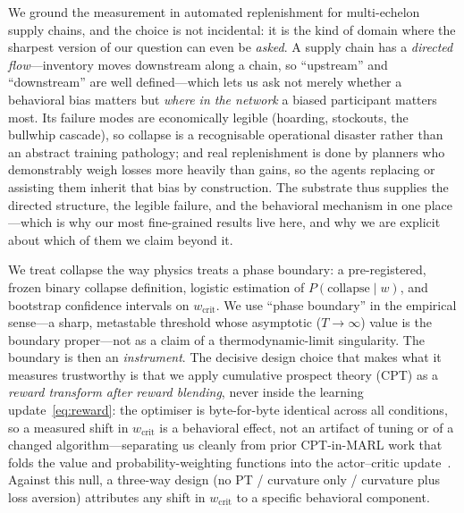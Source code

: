 \documentclass[letterpaper]{article}
\theoremstyle{plain}
\newcommand{\wcrit}{w_{\mathrm{crit}}}
\begin{document}
We ground the measurement in automated replenishment for multi-echelon supply
chains, and the choice is not incidental: it is the kind of domain where the
sharpest version of our question can even be \emph{asked}. A supply chain has a
\emph{directed flow}---inventory moves downstream along a chain, so ``upstream''
and ``downstream'' are well defined---which lets us ask not merely whether a
behavioral bias matters but \emph{where in the network} a biased participant
matters most. Its failure modes are economically legible (hoarding,
stockouts, the bullwhip cascade), so collapse is a recognisable operational
disaster rather than an abstract training pathology; and real replenishment is
done by planners who demonstrably weigh losses more heavily than gains, so the
agents replacing or assisting them inherit that bias by construction. The
substrate thus supplies the directed structure, the legible failure, and the
behavioral mechanism in one place---which is why our most fine-grained results
live here, and why we are explicit about which of them we claim beyond it.

We treat collapse the way physics treats a phase boundary: a pre-registered,
frozen binary collapse definition, logistic estimation of
$P(\mathrm{collapse}\mid w)$, and bootstrap confidence intervals on $\wcrit$. We
use ``phase boundary'' in the empirical sense---a sharp, metastable threshold
whose asymptotic ($T\!\to\!\infty$) value is the boundary proper---not as a claim
of a thermodynamic-limit singularity. The boundary is then an \emph{instrument}.
The decisive design choice that makes what it measures trustworthy is that we
apply cumulative prospect theory (CPT) as a \emph{reward transform after reward
blending}, never inside the learning update~\eqref{eq:reward}: the optimiser is
byte-for-byte identical across all conditions, so a measured shift in $\wcrit$ is
a behavioral effect, not an artifact of tuning or of a changed
algorithm---separating us cleanly from prior CPT-in-MARL work that folds the
value and probability-weighting functions into the actor--critic
update~\citep{lalmohammed2025}. Against this null, a three-way design
(no PT / curvature only / curvature plus loss aversion) attributes any shift in
$\wcrit$ to a specific behavioral component.
\end{document}
